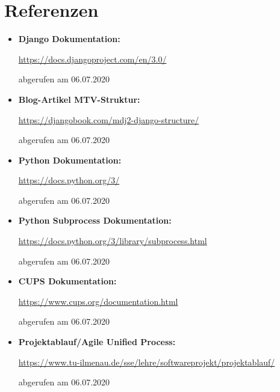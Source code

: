 \section{Referenzen}
\begin{itemize}
    \item \textbf{Django Dokumentation:}\par \href{https://docs.djangoproject.com/en/3.0/}{https://docs.djangoproject.com/en/3.0/}\par abgerufen am 06.07.2020
    \item \textbf{Blog-Artikel MTV-Struktur:}\par \href{https://djangobook.com/mdj2-django-structure/}{https://djangobook.com/mdj2-django-structure/}\par abgerufen am 06.07.2020
    \item \textbf{Python Dokumentation:}\par \href{https://docs.python.org/3/}{https://docs.python.org/3/}\par abgerufen am 06.07.2020
    \item \textbf{Python Subprocess Dokumentation:}\par \href{https://docs.python.org/3/library/subprocess.html}{https://docs.python.org/3/library/subprocess.html}\par abgerufen am 06.07.2020
    \item \textbf{CUPS Dokumentation:}\par \href{https://www.cups.org/documentation.html}{https://www.cups.org/documentation.html}\par abgerufen am 06.07.2020
    \item \textbf{Projektablauf/Agile Unified Process:}\par \href{https://www.tu-ilmenau.de/sse/lehre/softwareprojekt/projektablauf/}{https://www.tu-ilmenau.de/sse/lehre/softwareprojekt/projektablauf/}\par abgerufen am 06.07.2020
\end{itemize}






